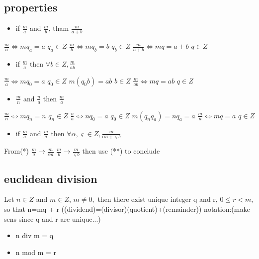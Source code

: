 \documentclass[a4paper,10pt]{article}
\begin{document}
{\subsection{properties}
\begin{itemize}
 \item if $\frac{m}{a}$ and $\frac{m}{b}$, tham $\frac{m}{a+b}$
\end{itemize}
$\frac{m}{a}\Leftrightarrow mq_a=a$ $q_a\in Z$
\newline
$\frac{m}{b}\Leftrightarrow mq_b=b$ $q_b\in Z$
\newline
$\frac{m}{a+b}\Leftrightarrow mq=a+b$ $q\in Z$
\begin{itemize}
 \item if $\frac{m}{a}$ then $\forall b\in Z, \frac{m}{ab}$
\end{itemize}
$\frac{m}{a}\Leftrightarrow mq_0=a$ $q_0\in Z$
\newline
$m(q_0b)=ab$ $b\in Z$
\newline
$\frac{m}{ab}\Leftrightarrow mq=ab$ $q\in Z$
\begin{itemize}
 \item $\frac{m}{n}$ and $\frac{n}{a}$ then $\frac{m}{a}$
\end{itemize}
$\frac{m}{n}\Leftrightarrow mq_n=n$ $q_n\in Z$
\newline
$\frac{n}{a}\Leftrightarrow nq_0=a$ $q_0\in Z$
\newline
$m(q_nq_a)=nq_a=a$
\newline
$\frac{m}{a}\Leftrightarrow mq=a$ $q\in Z$
\begin{itemize}
 \item if $\frac{m}{a}$ and $\frac{m}{a}$ then $\forall \alpha,\varsigma \in Z,\frac{m}{\alpha a+\varsigma b}$
\end{itemize}
From(*)
\newline
$\frac{m}{a}\rightarrow \frac{m}{\alpha a}$
\newline
$\frac{m}{b}\rightarrow \frac{m}{\varsigma b}$
\newline
then use (**) to conclude
\subsection{euclidean division}
Let $n\in Z$ and $m\in Z$, $m\neq 0,$ then there exist unique integer q and r, $0\leq r < m,$ so that n=mq + r ((dividend)=(divisor)(quotient)+(remainder))
\newline
notation:(make sens since q and r are unique...)
\begin{itemize}
 \item n div m = q
 \item n mod m = r
\end{itemize}
}
\end{document}
